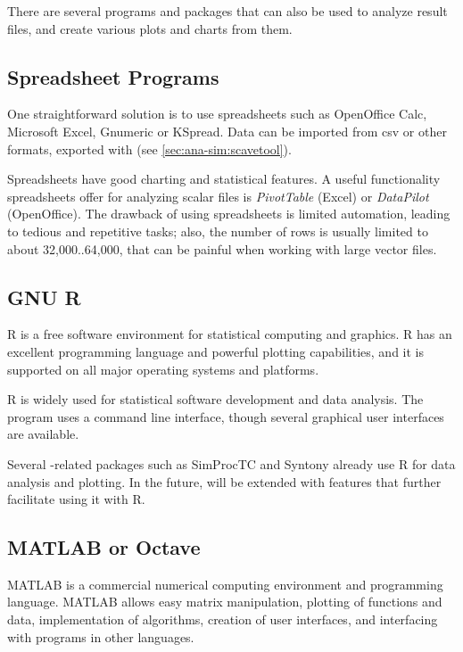 There are several programs and packages that can also be used to analyze
result files, and create various plots and charts from them.


\subsection{Spreadsheet Programs}

One straightforward solution is to use spreadsheets such as OpenOffice
Calc, Microsoft Excel, Gnumeric or KSpread. Data can be imported from csv
or other formats, exported with  (see
\ref{sec:ana-sim:scavetool}).

Spreadsheets have good charting and statistical features. A useful
functionality spreadsheets offer for analyzing scalar files is
\textit{PivotTable} (Excel) or \textit{DataPilot} (OpenOffice). The
drawback of using spreadsheets is limited automation, leading to tedious
and repetitive tasks; also, the number of rows is usually limited to about
32,000..64,000, that can be painful when working with large vector files.


\subsection{GNU R}
\label{sec:ana-sim:gnu-r}

R is a free software environment for statistical computing and graphics.
R has an excellent programming language and powerful plotting capabilities,
and it is supported on all major operating systems and platforms.

R is widely used for statistical software development and data analysis.
The program uses a command line interface, though several graphical user
interfaces are available.

Several {\opp}-related packages such as SimProcTC and Syntony already
use R for data analysis and plotting. In the future, {\opp} will
be extended with features that further facilitate using it with R.


\subsection{MATLAB or Octave}

MATLAB is a commercial numerical computing environment and programming language.
MATLAB allows easy matrix manipulation, plotting of functions and data,
implementation of algorithms, creation of user interfaces, and interfacing
with programs in other languages.

